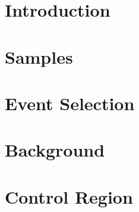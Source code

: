 \documentclass[UKenglish,texlive=2015]{latex/atlasdoc}
\begin{document}
\maketitle
\tableofcontents



\section{Introduction}
\label{sec:intro}
 

\clearpage
\section{Samples}
\label{sec:samples}
 

\clearpage
\section{Event Selection}
\label{sec:selection}



\clearpage
\section{Background}
\label{sec:bkg}





\clearpage
\section{Control Region}
\label{sec:CR}

\end{document}

